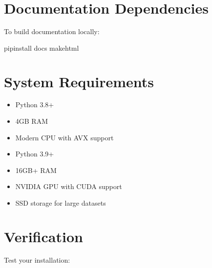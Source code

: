 \documentclass[letterpaper,10pt,english]{sphinxmanual}
\begin{document}
\section{Documentation Dependencies}
\label{\detokenize{installation:documentation-dependencies}}
\sphinxAtStartPar
To build documentation locally:

\begin{sphinxVerbatim}[commandchars=\\\{\}]
pipinstall
docs
makehtml
\end{sphinxVerbatim}


\section{System Requirements}
\label{\detokenize{installation:system-requirements}}
\sphinxAtStartPar
{}
\begin{itemize}
\item {} 
\sphinxAtStartPar
Python 3.8+

\item {} 
\sphinxAtStartPar
4GB RAM

\item {} 
\sphinxAtStartPar
Modern CPU with AVX support

\end{itemize}

\sphinxAtStartPar
{}
\begin{itemize}
\item {} 
\sphinxAtStartPar
Python 3.9+

\item {} 
\sphinxAtStartPar
16GB+ RAM

\item {} 
\sphinxAtStartPar
NVIDIA GPU with CUDA support

\item {} 
\sphinxAtStartPar
SSD storage for large datasets

\end{itemize}


\section{Verification}
\label{\detokenize{installation:verification}}
\sphinxAtStartPar
Test your installation:
\end{document}
